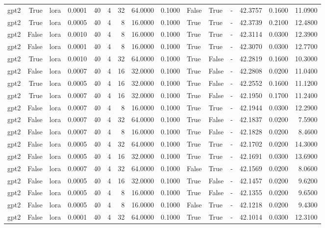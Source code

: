 \begin{tabular}{lrlrrrrrrlllrrr}
gpt2 & True & lora & 0.0001 & 40 & 4 & 32 & 64.0000 & 0.1000 & False & True & - & 42.3757 & 0.1600 & 11.0900 \\
gpt2 & True & lora & 0.0005 & 40 & 4 & 8 & 16.0000 & 0.1000 & True & True & - & 42.3739 & 0.2100 & 12.4800 \\
gpt2 & False & lora & 0.0010 & 40 & 4 & 8 & 16.0000 & 0.1000 & True & True & - & 42.3114 & 0.0300 & 12.3900 \\
gpt2 & False & lora & 0.0001 & 40 & 4 & 8 & 16.0000 & 0.1000 & True & True & - & 42.3070 & 0.0300 & 12.7700 \\
gpt2 & True & lora & 0.0010 & 40 & 4 & 32 & 64.0000 & 0.1000 & True & False & - & 42.2819 & 0.1600 & 10.3000 \\
gpt2 & False & lora & 0.0007 & 40 & 4 & 16 & 32.0000 & 0.1000 & True & False & - & 42.2808 & 0.0200 & 11.0400 \\
gpt2 & True & lora & 0.0005 & 40 & 4 & 16 & 32.0000 & 0.1000 & True & False & - & 42.2552 & 0.1600 & 11.1200 \\
gpt2 & True & lora & 0.0007 & 40 & 4 & 16 & 32.0000 & 0.1000 & True & False & - & 42.1950 & 0.1700 & 11.2400 \\
gpt2 & False & lora & 0.0007 & 40 & 4 & 8 & 16.0000 & 0.1000 & True & True & - & 42.1944 & 0.0300 & 12.2900 \\
gpt2 & False & lora & 0.0007 & 40 & 4 & 32 & 64.0000 & 0.1000 & True & False & - & 42.1837 & 0.0200 & 7.5900 \\
gpt2 & False & lora & 0.0007 & 40 & 4 & 8 & 16.0000 & 0.1000 & True & False & - & 42.1828 & 0.0200 & 8.4600 \\
gpt2 & False & lora & 0.0005 & 40 & 4 & 32 & 64.0000 & 0.1000 & True & True & - & 42.1702 & 0.0200 & 14.3000 \\
gpt2 & False & lora & 0.0005 & 40 & 4 & 16 & 32.0000 & 0.1000 & True & True & - & 42.1691 & 0.0300 & 13.6900 \\
gpt2 & False & lora & 0.0007 & 40 & 4 & 32 & 64.0000 & 0.1000 & False & True & - & 42.1569 & 0.0200 & 8.0600 \\
gpt2 & False & lora & 0.0005 & 40 & 4 & 16 & 32.0000 & 0.1000 & True & False & - & 42.1457 & 0.0200 & 9.6200 \\
gpt2 & False & lora & 0.0005 & 40 & 4 & 8 & 16.0000 & 0.1000 & True & False & - & 42.1355 & 0.0200 & 9.6500 \\
gpt2 & False & lora & 0.0005 & 40 & 4 & 8 & 16.0000 & 0.1000 & False & True & - & 42.1218 & 0.0200 & 9.4300 \\
gpt2 & False & lora & 0.0001 & 40 & 4 & 32 & 64.0000 & 0.1000 & True & True & - & 42.1014 & 0.0300 & 12.3100 \\

\end{tabular}
